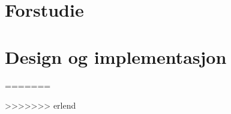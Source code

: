 \documentclass[11pt, a4paper]{report}
\newcommand{\comment}[1]{} \comment{This is a block comment wrapped in curly brackets}
\begin{document}



%
%

\tableofcontents
\newpage
{}






\comment{ foreløpig struktur på rapport:
Sammendrag
Innhold
Introduksjon
	Gruppen
	Initiativet
	Problemet
	Ideen
Pre study
	Mekanikk
	Hardware
	Software
Markedsundersøkelse
	generelt
	4 p'er
Løsning
	valg av løsning
	hardware
	software
		GUI
	diskusjon
Konklusjon
Referanseliste
Vedlegg
}


\chapter{Forstudie}
	
	
	
	
%
\chapter{Design og implementasjon}
%
%
%
=======


>>>>>>> erlend

\newpage
{}
\listoftables
{}
\listoffigures
{}



%
\end{document}
